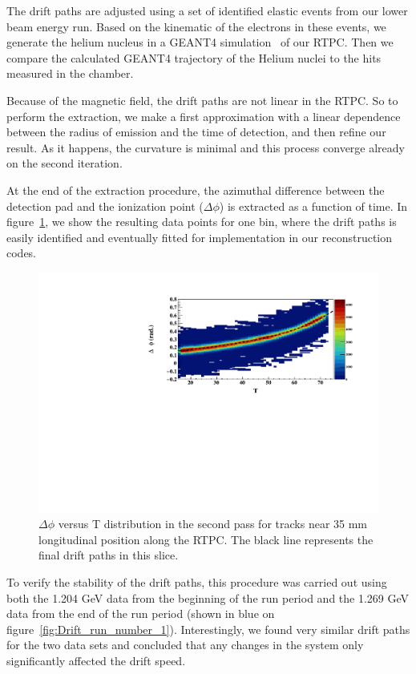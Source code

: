 \documentclass[twocolumn,showpacs,superscriptaddress,groupedaddress]{revtex4}
\begin{document}
The drift paths are adjusted using a set of identified elastic events from our 
lower beam energy run. Based on the kinematic of the electrons in these events, 
we generate the helium nucleus in a GEANT4 simulation~\cite{GEANT4} of our 
RTPC. Then we compare the calculated GEANT4 trajectory of the Helium nuclei to 
the hits measured in the chamber. 

Because of the magnetic field, the drift paths are not linear in the RTPC. So 
to perform the extraction, we make a first approximation with a linear 
dependence between the radius of emission and the time of detection, and then 
refine our result. As it happens, the curvature is minimal and this process 
converge already on the second iteration. 

At the end of the extraction procedure, the azimuthal difference between the detection pad and 
the ionization point ($\Delta\phi$) is extracted as a function of time. 
In figure~\ref{fig:DELTA_PHI_TDC}, we show the resulting data points for one 
bin, where the drift paths is easily identified and eventually fitted for 
implementation in our reconstruction codes.

\begin{figure}[tb]
\centering
\includegraphics[scale=0.42]{fig_2017/FitResult_p2_11.pdf}
\caption{$\Delta \phi$ versus T distribution in the second pass for tracks
near 35 mm longitudinal position along the RTPC. The black line represents 
the final drift paths in this slice.}
\label{fig:DELTA_PHI_TDC}
\end{figure}

To verify the stability of the drift paths, this procedure was carried out 
using both the 1.204 GeV data from the beginning of the run period and the 
1.269 GeV data from the end of the run period (shown in blue on 
figure~\ref{fig:Drift_run_number_1}). Interestingly, we found very similar drift paths
for the two data sets and concluded that any changes in the system only
significantly affected the drift speed.
\end{document}
